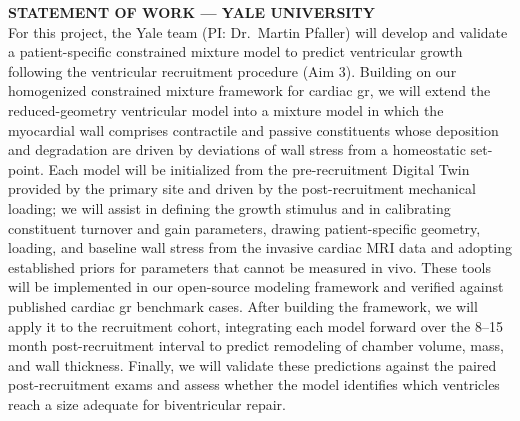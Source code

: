 \documentclass[11pt]{article}
\begin{document}
\textbf{\uppercase{Statement of Work --- Yale University}}\\[.5em]

For this project, the Yale team (PI: Dr.\ Martin Pfaller) will develop and validate a patient-specific constrained mixture model to predict ventricular growth following the ventricular recruitment procedure (Aim 3). Building on our homogenized constrained mixture framework for cardiac \gls*{gr}, we will extend the reduced-geometry ventricular model into a mixture model in which the myocardial wall comprises contractile and passive constituents whose deposition and degradation are driven by deviations of wall stress from a homeostatic set-point. Each model will be initialized from the pre-recruitment Digital Twin provided by the primary site and driven by the post-recruitment mechanical loading; we will assist in defining the growth stimulus and in calibrating constituent turnover and gain parameters, drawing patient-specific geometry, loading, and baseline wall stress from the invasive cardiac MRI data and adopting established priors for parameters that cannot be measured in vivo. These tools will be implemented in our open-source modeling framework and verified against published cardiac \gls*{gr} benchmark cases. After building the framework, we will apply it to the recruitment cohort, integrating each model forward over the 8--15 month post-recruitment interval to predict remodeling of chamber volume, mass, and wall thickness. Finally, we will validate these predictions against the paired post-recruitment exams and assess whether the model identifies which ventricles reach a size adequate for biventricular repair.
\end{document}

